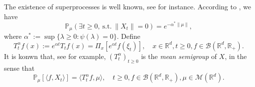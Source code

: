 \documentclass[12pt]{amsart}
\theoremstyle{plain}
\theoremstyle{definition}
\numberwithin{equation}{section}
\begin{document}
	The existence of superprocesses is well known, see \cite{Dynkin1993Superprocesses} for instance.
    According to \cite[Theorem 12.5 \& Theorem 12.7]{Kyprianou2014Fluctuations}, we have
\begin{equation}
    \mathbb{P}_{\mu} (\exists t\geq 0,~\text{s.t.}~\|X_t\|=0)
    = e^{-\alpha^* \|\mu\|},
\end{equation}
    where $\alpha^* := \sup\{\lambda \geq 0: \psi(\lambda) = 0\}$.
    Define 
\begin{equation}\label{meansemigroup}
    T^{\alpha}_t f(x)
    :=
    e^{\alpha t} T_t f(x) =
    \Pi_x [e^{\alpha t}f(\xi_t)],
    \quad x\in \mathbb{R}^d,t\geq 0, f\in \mathcal B(\mathbb R^d, \mathbb R_+).
\end{equation}
    It is konwn that, see \cite[Proposition 2.27]{Li2011Measure-valued} for example, $(T^\alpha_t)_{t\geq 0}$ is the \emph{mean semigroup} of $X$, in the sense that
\begin{equation}\label{eq:meanformula}
    \mathbb{P}_{\mu}[\langle f, X_t \rangle]
    = \langle T_t^\alpha f, \mu \rangle,
    \quad t\geq 0, f\in \mathcal B(\mathbb R^d, \mathbb R_+), \mu \in \mathcal M(\mathbb R^d).
\end{equation}
\end{document}
